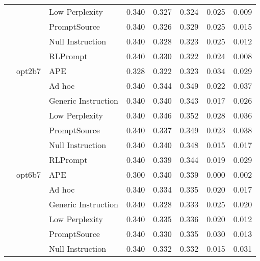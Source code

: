 \begin{supertabular}{lllrrrrr}
              &        & Low Perplexity &            0.340 &           0.327 &          0.324 &        0.025 &    0.009 \\
              &        & PromptSource &            0.340 &           0.326 &          0.329 &        0.025 &    0.015 \\
              &        & Null Instruction &            0.340 &           0.328 &          0.323 &        0.025 &    0.012 \\
              &        & RLPrompt &            0.340 &           0.330 &          0.322 &        0.024 &    0.008 \\
              & opt2b7 & APE &            0.328 &           0.322 &          0.323 &        0.034 &    0.029 \\
              &        & Ad hoc &            0.340 &           0.344 &          0.349 &        0.022 &    0.037 \\
              &        & Generic Instruction &            0.340 &           0.340 &          0.343 &        0.017 &    0.026 \\
              &        & Low Perplexity &            0.340 &           0.346 &          0.352 &        0.028 &    0.036 \\
              &        & PromptSource &            0.340 &           0.337 &          0.349 &        0.023 &    0.038 \\
              &        & Null Instruction &            0.340 &           0.340 &          0.348 &        0.015 &    0.017 \\
              &        & RLPrompt &            0.340 &           0.339 &          0.344 &        0.019 &    0.029 \\
              & opt6b7 & APE &            0.300 &           0.340 &          0.339 &        0.000 &    0.002 \\
              &        & Ad hoc &            0.340 &           0.334 &          0.335 &        0.020 &    0.017 \\
              &        & Generic Instruction &            0.340 &           0.328 &          0.333 &        0.025 &    0.020 \\
              &        & Low Perplexity &            0.340 &           0.335 &          0.336 &        0.020 &    0.012 \\
              &        & PromptSource &            0.340 &           0.330 &          0.335 &        0.030 &    0.013 \\
              &        & Null Instruction &            0.340 &           0.332 &          0.332 &        0.015 &    0.031 \\

\end{supertabular}
